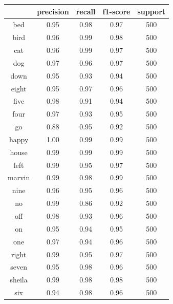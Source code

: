 \documentclass{bmvc2k}
\begin{document}
\begin{table}[htbp]
\centering
\begin{tabular}{|c|c|c|c|c|}
\hline
             & precision  &  recall & f1-score &  support \\ \hline

         bed &      0.95  &    0.98  &    0.97 &      500 \\ \hline
        bird &      0.96  &    0.99  &    0.98 &      500 \\ \hline
         cat &      0.96  &    0.99  &    0.97 &      500 \\ \hline
         dog &      0.97  &    0.96  &    0.97 &      500 \\ \hline
        down &      0.95  &    0.93  &    0.94 &      500 \\ \hline
       eight &      0.95  &    0.97  &    0.96 &      500 \\ \hline
        five &      0.98  &    0.91  &    0.94 &      500 \\ \hline
        four &      0.97  &    0.93  &    0.95 &      500 \\ \hline
          go &      0.88  &    0.95  &    0.92 &      500 \\ \hline
       happy &      1.00  &    0.99  &    0.99 &      500 \\ \hline
       house &      0.99  &    0.99  &    0.99 &      500 \\ \hline
        left &      0.99  &    0.95  &    0.97 &      500 \\ \hline
      marvin &      0.99  &    0.98  &    0.99 &      500 \\ \hline
        nine &      0.96  &    0.95  &    0.96 &      500 \\ \hline
          no &      0.99  &    0.86  &    0.92 &      500 \\ \hline
         off &      0.98  &    0.93  &    0.96 &      500 \\ \hline
          on &      0.95  &    0.94  &    0.95 &      500 \\ \hline
         one &      0.97  &    0.94  &    0.96 &      500 \\ \hline
       right &      0.99  &    0.95  &    0.97 &      500 \\ \hline
       seven &      0.95  &    0.98  &    0.96 &      500 \\ \hline
      sheila &      0.99  &    0.98  &    0.98 &      500 \\ \hline
         six &      0.94  &    0.98  &    0.96 &      500 \\ \hline

\end{tabular}
\end{table}
\end{document}
